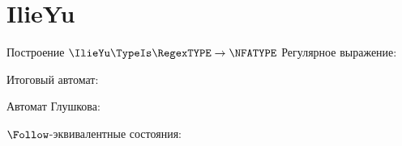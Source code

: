 \section{IlieYu}
\begin{frame}{Построение $\IlieYu\TypeIs\RegexTYPE\to\NFATYPE$}
	Регулярное выражение:

	Итоговый автомат:


	Автомат Глушкова:


	$\Follow$-эквивалентные состояния:


\end{frame}


